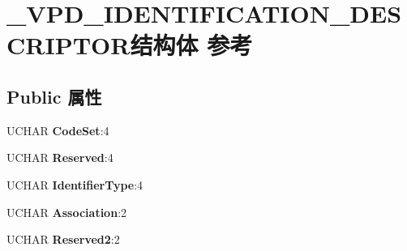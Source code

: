 \hypertarget{struct___v_p_d___i_d_e_n_t_i_f_i_c_a_t_i_o_n___d_e_s_c_r_i_p_t_o_r}{}\section{\+\_\+\+V\+P\+D\+\_\+\+I\+D\+E\+N\+T\+I\+F\+I\+C\+A\+T\+I\+O\+N\+\_\+\+D\+E\+S\+C\+R\+I\+P\+T\+O\+R结构体 参考}
\label{struct___v_p_d___i_d_e_n_t_i_f_i_c_a_t_i_o_n___d_e_s_c_r_i_p_t_o_r}
\subsection*{Public 属性}
\begin{DoxyCompactItemize}
\item 
\mbox{\label{struct___v_p_d___i_d_e_n_t_i_f_i_c_a_t_i_o_n___d_e_s_c_r_i_p_t_o_r_a575920adb1bf8b540f4a194364a3ef07}} 
U\+C\+H\+AR {\bfseries Code\+Set}\+:4
\item 
\mbox{\label{struct___v_p_d___i_d_e_n_t_i_f_i_c_a_t_i_o_n___d_e_s_c_r_i_p_t_o_r_aeb078af87e3fe7418ff093fab2d200d4}} 
U\+C\+H\+AR {\bfseries Reserved}\+:4
\item 
\mbox{\label{struct___v_p_d___i_d_e_n_t_i_f_i_c_a_t_i_o_n___d_e_s_c_r_i_p_t_o_r_a0c3197e95bf3596e2f6130120abf0fb6}} 
U\+C\+H\+AR {\bfseries Identifier\+Type}\+:4
\item 
\mbox{\label{struct___v_p_d___i_d_e_n_t_i_f_i_c_a_t_i_o_n___d_e_s_c_r_i_p_t_o_r_a655ea2fbd6687a2bb68ea4ef4d734763}} 
U\+C\+H\+AR {\bfseries Association}\+:2
\item 
\mbox{\label{struct___v_p_d___i_d_e_n_t_i_f_i_c_a_t_i_o_n___d_e_s_c_r_i_p_t_o_r_a9c7a769552829e1ffbc3bc6a8d0fb8e6}} 
U\+C\+H\+AR {\bfseries Reserved2}\+:2
\item 
\mbox{\label{struct___v_p_d___i_d_e_n_t_i_f_i_c_a_t_i_o_n___d_e_s_c_r_i_p_t_o_r_a80d022ac60952a7fdbf025af4005ae1c}} 

\end{DoxyCompactItemize}
